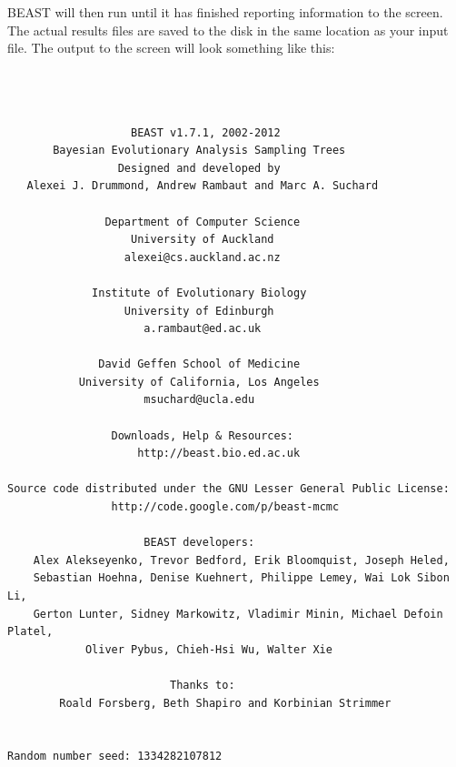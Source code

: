 \documentclass[12pt]{article}
\begin{document}
\medskip{}

BEAST will then run until it has finished
reporting information to the screen. The actual results files are
saved to the disk in the same location as your input file. The output to the screen will
look something like this: 

{\scriptsize   
\begin{verbatim}



                   BEAST v1.7.1, 2002-2012
       Bayesian Evolutionary Analysis Sampling Trees
                 Designed and developed by
   Alexei J. Drummond, Andrew Rambaut and Marc A. Suchard
                              
               Department of Computer Science
                   University of Auckland
                  alexei@cs.auckland.ac.nz
                              
             Institute of Evolutionary Biology
                  University of Edinburgh
                     a.rambaut@ed.ac.uk
                              
              David Geffen School of Medicine
           University of California, Los Angeles
                     msuchard@ucla.edu
                              
                Downloads, Help & Resources:
                 	http://beast.bio.ed.ac.uk
                              
Source code distributed under the GNU Lesser General Public License:
            	http://code.google.com/p/beast-mcmc
                              
                     BEAST developers:
	Alex Alekseyenko, Trevor Bedford, Erik Bloomquist, Joseph Heled, 
	Sebastian Hoehna, Denise Kuehnert, Philippe Lemey, Wai Lok Sibon Li, 
	Gerton Lunter, Sidney Markowitz, Vladimir Minin, Michael Defoin Platel, 
          	Oliver Pybus, Chieh-Hsi Wu, Walter Xie
                              
                         Thanks to:
    	Roald Forsberg, Beth Shapiro and Korbinian Strimmer


Random number seed: 1334282107812



\end{verbatim}}
\end{document}
